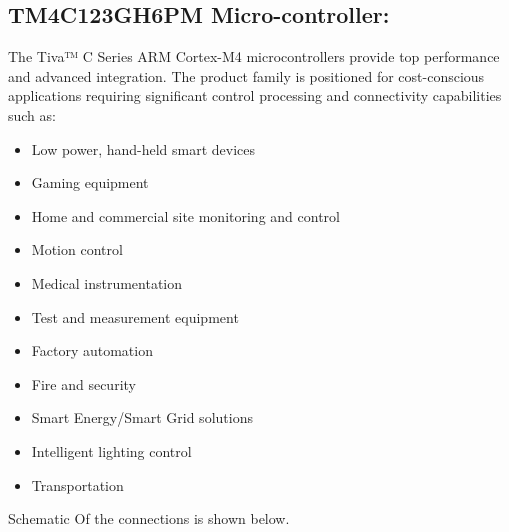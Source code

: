 \documentclass[a4paper,12pt,oneside]{article}
\begin{document}
{	\subsection{ \textbf{TM4C123GH6PM Micro-controller:}}
	{The Tiva™ C Series ARM Cortex-M4 microcontrollers provide top performance and advanced
		integration. The product family is positioned for cost-conscious applications requiring significant
		control processing and connectivity capabilities such as:
		\begin{itemize}
		\item Low power, hand-held smart devices
		\item Gaming equipment
		\item Home and commercial site monitoring and control
		\item Motion control
		\item Medical instrumentation
		\item Test and measurement equipment
		\item	Factory automation
		\item Fire and security
		\item  Smart Energy/Smart Grid solutions
		\item Intelligent lighting control
		\item Transportation
	\end{itemize}
	Schematic Of the connections is shown below.}
	\begin{center}

\end{center}}
\end{document}
